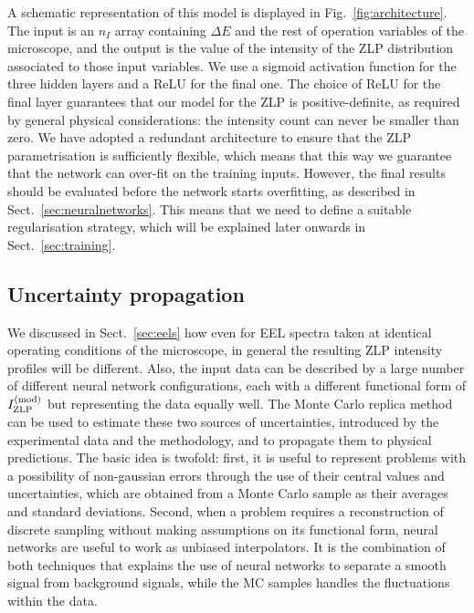 A schematic representation of this model
is displayed in Fig.~\ref{fig:architecture}.
%
 The input is an $n_I$ array containing $\Delta E$ and the rest of
 operation variables of the microscope, and
 the output is the value of the intensity of the ZLP distribution
 associated to those input variables.
 We use a sigmoid activation function for the three hidden layers and a ReLU
 for the final one.
 The choice of ReLU for the final layer guarantees that our model for the ZLP
 is positive-definite, as required by general physical considerations: the intensity
 count can never be smaller than zero.
 We have adopted a redundant architecture to ensure that the ZLP parametrisation
 is sufficiently flexible, which means that this way we guarantee that
 the network can over-fit on the training inputs.
 However, the final results should be evaluated before the network starts overfitting,
 as described in Sect.~\ref{sec:neuralnetworks}. 
 This means that we need to define a suitable regularisation strategy, which 
 will be explained later onwards in Sect.~\ref{sec:training}.



\subsection{Uncertainty propagation}

We discussed in Sect.~\ref{sec:eels} how
even for EEL spectra taken at identical operating conditions of the microscope,
in general the resulting ZLP intensity profiles will be different.
%
Also, the input data can be described by a large number of different neural 
network configurations, each with a different functional form of $I_{\rm ZLP}^{(\rm mod)}$
but representing the data equally well.
%
The Monte Carlo replica method can be used to estimate these two sources of 
uncertainties, introduced by the experimental data and the methodology,
and to propagate them to physical predictions.
%
The basic idea is twofold:
first, it is useful to represent problems with a possibility of non-gaussian errors
through the use of their central values and uncertainties, which are obtained from a Monte Carlo sample
as their averages and standard deviations.
%
Second, when a problem requires a reconstruction of discrete sampling without making assumptions on its 
functional form, neural networks are useful to work as unbiased interpolators. 
%
It is the combination of both techniques that explains the use of neural networks to separate a smooth
signal from background signals, while the MC samples handles the fluctuations within the data.\\

